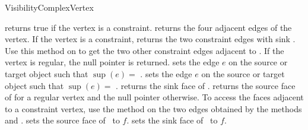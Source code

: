 \begin{ccRefConcept}{VisibilityComplexVertex}
\ccTypes
{} {}
\ccThreeToTwo

\ccCreation
{}


\ccOperations

\ccTagFullDeclarations
{}
    {returns true if the vertex is a constraint.}
\ccGlue
{}
\ccGlue
{}
\ccGlue
{}
    {returns the four adjacent edges of the vertex.}
\ccGlue
{}
    {If the vertex is a constraint, returns the two constraint edges with sink
     \ccVar. Use this method on  to get the two other constraint
     edges adjacent to \ccVar. If the vertex is regular, the null pointer is returned.}
    {sets the edge $e$ on the source or target object such that $\sup(e) = $ \ccVar.}
\ccGlue
{}
    {sets the edge $e$ on the source or target object such that $\sup(e) = $ \ccVar.}
    {returns the sink face of \ccVar.}
\ccGlue
{}
    {returns the source face of \ccVar for a regular vertex and the null pointer
     otherwise. To access the faces adjacent to a constraint vertex, use
     the method  on the two edges obtained by the methods
      and .}
\ccGlue
{}
    {sets the source face of \ccVar\  to $f$.}
\ccGlue
{}
    {sets the sink face of \ccVar\  to $f$.}

\ccTagDefaults

\ccHasModels



\end{ccRefConcept}
